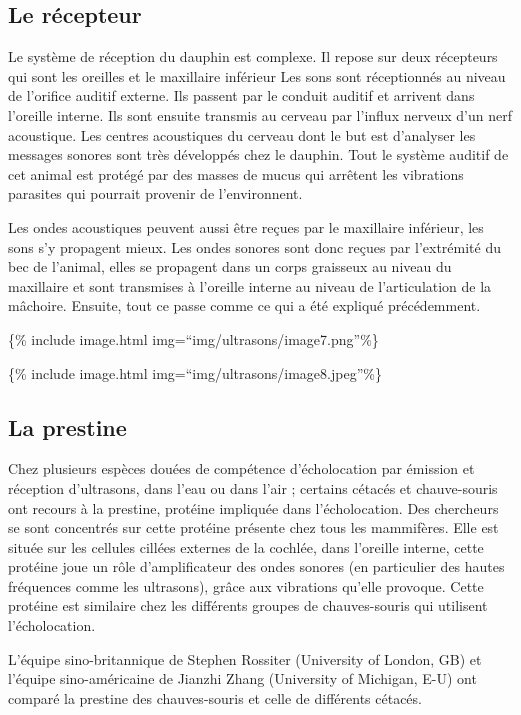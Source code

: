 \subsection{Le récepteur}\label{le-ruxe9cepteur}

Le système de réception du dauphin est complexe. Il repose sur deux
récepteurs qui sont les oreilles et le maxillaire inférieur Les sons
sont réceptionnés au niveau de l'orifice auditif externe. Ils passent
par le conduit auditif et arrivent dans l'oreille interne. Ils sont
ensuite transmis au cerveau par l'influx nerveux d'un nerf acoustique.
Les centres acoustiques du cerveau dont le but est d'analyser les
messages sonores sont très développés chez le dauphin. Tout le système
auditif de cet animal est protégé par des masses de mucus qui arrêtent
les vibrations parasites qui pourrait provenir de l'environnent.

Les ondes acoustiques peuvent aussi être reçues par le maxillaire
inférieur, les sons s'y propagent mieux. Les ondes sonores sont donc
reçues par l'extrémité du bec de l'animal, elles se propagent dans un
corps graisseux au niveau du maxillaire et sont transmises à l'oreille
interne au niveau de l'articulation de la mâchoire. Ensuite, tout ce
passe comme ce qui a été expliqué précédemment.

\{\% include image.html img=``img/ultrasons/image7.png''\%\}

\{\% include image.html img=``img/ultrasons/image8.jpeg''\%\}

\subsection{La prestine}\label{la-prestine}

Chez plusieurs espèces douées de compétence d'écholocation par émission
et réception d'ultrasons, dans l'eau ou dans l'air ; certains cétacés et
chauve-souris ont recours à la prestine, protéine impliquée dans
l'écholocation. Des chercheurs se sont concentrés sur cette protéine
présente chez tous les mammifères. Elle est située sur les cellules
cillées externes de la cochlée, dans l'oreille interne, cette protéine
joue un rôle d'amplificateur des ondes sonores (en particulier des
hautes fréquences comme les ultrasons), grâce aux vibrations qu'elle
provoque. Cette protéine est similaire chez les différents groupes de
chauves-souris qui utilisent l'écholocation.

L'équipe sino-britannique de Stephen Rossiter (University of London, GB)
et l'équipe sino-américaine de Jianzhi Zhang (University of Michigan,
E-U) ont comparé la prestine des chauves-souris et celle de différents
cétacés.


